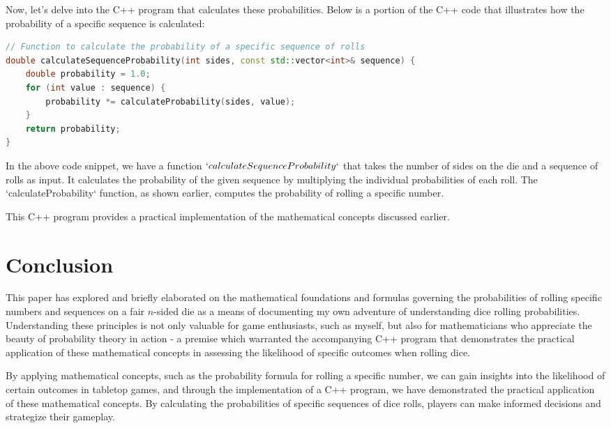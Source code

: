 \documentclass{article}
\begin{document}
Now, let's delve into the C++ program that calculates these probabilities. Below is a portion of the C++ code that
illustrates how the probability of a specific sequence is calculated:

\begin{lstlisting}[language=C++, caption=C++ Code for Probability Calculation]
// Function to calculate the probability of a specific sequence of rolls
double calculateSequenceProbability(int sides, const std::vector<int>& sequence) {
    double probability = 1.0;
    for (int value : sequence) {
        probability *= calculateProbability(sides, value);
    }
    return probability;
}
\end{lstlisting}

In the above code snippet, we have a function $`calculateSequenceProbability`$ that takes the number of sides on
the die and a sequence of rolls as input. It calculates the probability of the given sequence by multiplying
the individual probabilities of each roll. The `calculateProbability` function, as shown earlier, computes
the probability of rolling a specific number.

This C++ program provides a practical implementation of the mathematical concepts discussed earlier.

\section{Conclusion}

This paper has explored and briefly elaborated on the mathematical foundations and formulas governing the
probabilities of rolling specific numbers and sequences on a fair $n$-sided die as a means of documenting my own
adventure of understanding dice rolling probabilities. Understanding these principles is not only valuable for
game enthusiasts, such as myself, but also for mathematicians who appreciate the beauty of probability theory
in action - a premise which warranted the accompanying C++ program that demonstrates the practical
application of these mathematical concepts in assessing the likelihood of specific outcomes when rolling dice.

By applying mathematical concepts, such as the probability formula for rolling a specific number, we can gain
insights into the likelihood of certain outcomes in tabletop games, and through the implementation of a C++
program, we have demonstrated the practical application of these mathematical concepts. By calculating the
probabilities of specific sequences of dice rolls, players can make informed decisions and strategize their gameplay.
\end{document}
